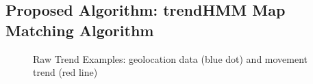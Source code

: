 \documentclass[preprint,12pt]{elsarticle}
\begin{document}
\subsection{Proposed Algorithm: trendHMM Map Matching Algorithm}
\label{sec:sec3:sec4}
\begin{figure}
	\centering
	\caption{Raw Trend Examples: geolocation data (blue dot) and movement trend (red line)}
	\label{fig:fig3}
\end{figure}
\end{document}
